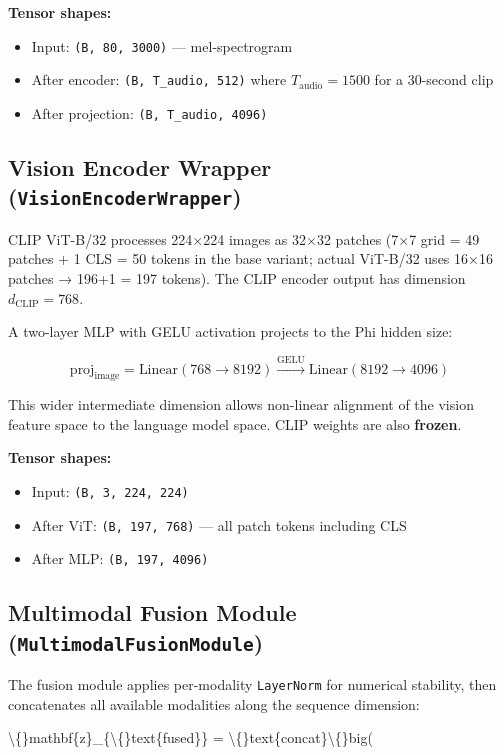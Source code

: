 \documentclass[11pt]{article}
\begin{document}
\textbf{Tensor shapes:}

\begin{itemize}[leftmargin=*]
\item Input: \texttt{(B, 80, 3000)} — mel-spectrogram
\item After encoder: \texttt{(B, T\_audio, 512)} where $T_{\text{audio}} = 1500$ for a 30-second clip
\item After projection: \texttt{(B, T\_audio, 4096)}

\end{itemize}
\subsection{Vision Encoder Wrapper (\texttt{VisionEncoderWrapper})}


CLIP ViT-B/32 processes 224×224 images as 32×32 patches (7×7 grid = 49 patches + 1 CLS = 50 tokens in the base variant; actual ViT-B/32 uses 16×16 patches → 196+1 = 197 tokens). The CLIP encoder output has dimension $d_{\text{CLIP}} = 768$.


A two-layer MLP with GELU activation projects to the Phi hidden size:


$$\text{proj}_{\text{image}} = \text{Linear}(768 \to 8192) \xrightarrow{\text{GELU}} \text{Linear}(8192 \to 4096)$$


This wider intermediate dimension allows non-linear alignment of the vision feature space to the language model space. CLIP weights are also \textbf{frozen}.


\textbf{Tensor shapes:}

\begin{itemize}[leftmargin=*]
\item Input: \texttt{(B, 3, 224, 224)}
\item After ViT: \texttt{(B, 197, 768)} — all patch tokens including CLS
\item After MLP: \texttt{(B, 197, 4096)}

\end{itemize}
\subsection{Multimodal Fusion Module (\texttt{MultimodalFusionModule})}


The fusion module applies per-modality \texttt{LayerNorm} for numerical stability, then concatenates all available modalities along the sequence dimension:


$$\textbackslash\{\}mathbf\{z\}\_\{\textbackslash\{\}text\{fused\}\} = \textbackslash\{\}text\{concat\}\textbackslash\{\}big(
\end{document}
